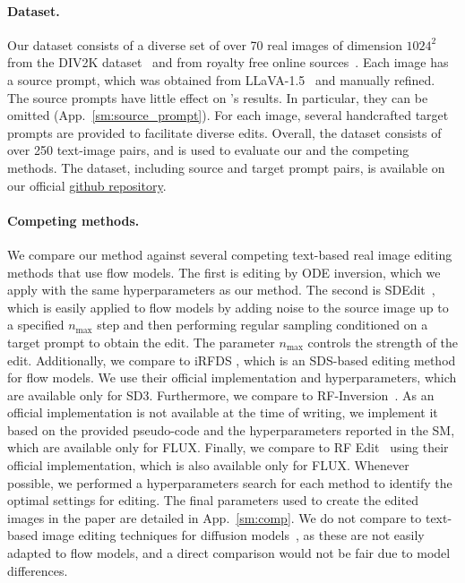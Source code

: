 \paragraph{Dataset.}

Our dataset consists of a diverse set of over 70 real images of dimension $1024^2$ from the DIV2K dataset~\citep{agustsson2017ntire} and from royalty free online sources~\cite{pexels, pxhere}. Each image has a source prompt, which was obtained from LLaVA-1.5~\cite{liu2024llava15} and manually refined. The source prompts have little effect on \ours{}'s results. In particular, they can be omitted (App.~\ref{sm:source_prompt}). For each image, several handcrafted target prompts are provided to facilitate diverse edits. Overall, the dataset consists of over 250 text-image pairs, and is used to evaluate our and the competing methods. The dataset, including source and target prompt pairs, is available on our official \href{https://github.com/fallenshock/FlowEdit}{github repository}.

\paragraph{Competing methods.}
We compare our method against several competing text-based real image editing methods that use flow models. The first is editing by ODE inversion, which we apply with the same hyperparameters as our method.
The second is SDEdit~\citep{meng2021sdedit}, which is easily applied to flow models by adding noise to the source image up to a specified $n_{\text{max}}$ step and then performing regular sampling conditioned on a target prompt to obtain the edit. The parameter $n_{\text{max}}$ controls the strength of the edit. 
Additionally, we compare to iRFDS \citep{yang2024text}, which is an SDS-based editing method for flow models. We use their official implementation and hyperparameters, which are available only for SD3.     
Furthermore, we compare to RF-Inversion~\citep{rout2024rfinversion}. As an official implementation is not available at the time of writing, we implement it based on the provided pseudo-code and the hyperparameters reported in the SM, which are available only for FLUX. 
Finally, we compare to RF Edit~\cite{wang2024taming} using their official implementation, which is also available only for FLUX. 
Whenever possible, we performed a hyperparameters search for each method to identify the optimal settings for editing. The final parameters used to create the edited images in the paper are detailed in App.~\ref{sm:comp}. 
We do not compare \ours{} to text-based image editing techniques for diffusion models~\cite{huberman2024edit, tumanyan2023plug, cao2023masactrl}, as these are not easily adapted to flow models, and a direct comparison would not be fair due to model differences. 

